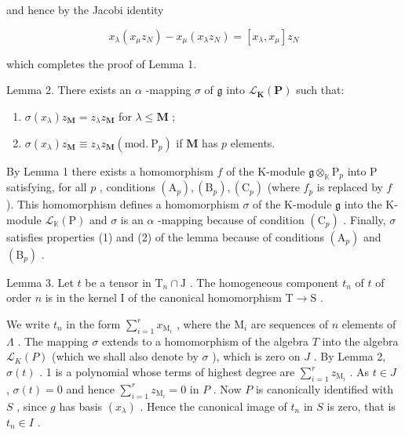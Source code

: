 and hence by the Jacobi identity

\[
x _ {\lambda} (x _ {\mu} z _ {N}) - x _ {\mu} (x _ {\lambda} z _ {N}) = [ x _ {\lambda}, x _ {\mu} ] z _ {N}
\]

which completes the proof of Lemma 1.

Lemma 2. There exists an \(\alpha\) -mapping \(\sigma\) of \(\mathfrak{g}\) into \(\mathcal{L}_{\mathbf{K}}(\mathbf{P})\) such that:

\begin{enumerate}
\def\labelenumi{(\arabic{enumi})}
\item
  \(\sigma(x_{\lambda})z_{\mathbf{M}} = z_{\lambda}z_{\mathbf{M}}\) for \(\lambda \leqslant \mathbf{M}\) ;
\item
  \(\sigma(x_{\lambda})z_{\mathbf{M}} \equiv z_{\lambda}z_{\mathbf{M}} (\mathrm{mod.~P}_{p})\) if \(\mathbf{M}\) has \(p\) elements.
\end{enumerate}

By Lemma 1 there exists a homomorphism \(f\) of the K-module \(\mathfrak{g} \otimes_{\mathbb{K}} \mathrm{P}_p\) into P satisfying, for all \(p\) , conditions \((\mathrm{A}_p), (\mathrm{B}_p), (\mathrm{C}_p)\) (where \(f_p\) is replaced by \(f\) ). This homomorphism defines a homomorphism \(\sigma\) of the K-module \(\mathfrak{g}\) into the K-module \(\mathcal{L}_{\mathbb{K}}(\mathrm{P})\) and \(\sigma\) is an \(\alpha\) -mapping because of condition \((\mathrm{C}_p)\) . Finally, \(\sigma\) satisfies properties (1) and (2) of the lemma because of conditions \((\mathrm{A}_p)\) and \((\mathrm{B}_p)\) .

Lemma 3. Let \(t\) be a tensor in \(\mathrm{T}_n \cap \mathrm{J}\) . The homogeneous component \(t_n\) of \(t\) of order \(n\) is in the kernel I of the canonical homomorphism \(\mathrm{T} \to \mathrm{S}\) .

We write \(t_n\) in the form \(\sum_{i=1}^{r} x_{\mathrm{M}_i}\) , where the \(\mathrm{M}_i\) are sequences of \(n\) elements of \(\Lambda\) . The mapping \(\sigma\) extends to a homomorphism of the algebra \(T\) into the algebra \(\mathcal{L}_K(P)\) (which we shall also denote by \(\sigma\) ), which is zero on \(J\) . By Lemma 2, \(\sigma(t)\) . 1 is a polynomial whose terms of highest degree are \(\sum_{i=1}^{r} z_{\mathrm{M}_i}\) . As \(t \in J\) , \(\sigma(t) = 0\) and hence \(\sum_{i=1}^{r} z_{\mathrm{M}_i} = 0\) in \(P\) . Now \(P\) is canonically identified with \(S\) , since \(g\) has basis \((x_\lambda)\) . Hence the canonical image of \(t_n\) in \(S\) is zero, that is \(t_n \in I\) .

